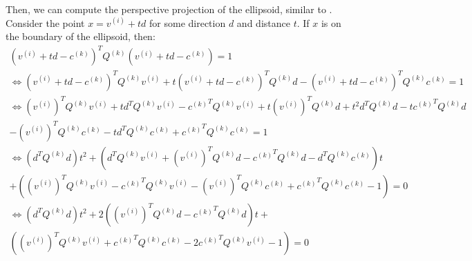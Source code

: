 \documentclass{article}
\theoremstyle{case}
\newcommand{\ck}{{c^{(k)}}}
\newcommand{\qk}{{Q^{(k)}}}
\begin{document}
Then, we can compute the perspective projection of the ellipsoid, similar to \cite{eberly_2013}.
Consider the point $x = v^{(i)} + td$ for some direction $d$ and distance $t$.
If $x$ is on the boundary of the ellipsoid, then:
\begin{align*}
(v^{(i)} + t d - \ck )^T \qk  (v^{(i)} + t d - \ck ) = 1 \\
\Longleftrightarrow (v^{(i)} + t d - \ck )^T \qk  v^{(i)} + t (v^{(i)} + t d - \ck )^T \qk  d - (v^{(i)} + t d - \ck )^T \qk  \ck  = 1 \\
\Longleftrightarrow \left(v^{(i)}\right)^T \qk  v^{(i)} + t d^T \qk  v^{(i)} - \ck ^T \qk  v^{(i)} + t \left(v^{(i)}\right)^T \qk  d + t^2 d^T \qk  d - t \ck ^T \qk  d \\- \left(v^{(i)}\right)^T \qk  \ck  - t d^T \qk  \ck + \ck ^T \qk  \ck  = 1 \\
\Longleftrightarrow \left(d^T\qk d
\right) t^2 + \left(
d^T \qk  v^{(i)} +  \left(v^{(i)}\right)^T \qk  d - \ck ^T \qk  d - d^T \qk  \ck 
\right) t \\ +  \left(
\left(v^{(i)}\right)^T \qk  v^{(i)} - \ck ^T \qk  v^{(i)} - \left(v^{(i)}\right)^T \qk  \ck   + \ck ^T \qk  \ck  - 1
\right) = 0 \\
\Longleftrightarrow \left(d^T\qk d
\right) t^2 + 2\left(
\left(v^{(i)}\right)^T \qk  d - \ck ^T\qk d
\right) t + \\ \left(
\left(v^{(i)}\right)^T \qk  v^{(i)} + \ck ^T \qk  \ck  - 2 \ck ^T \qk  v^{(i)} - 1
\right) = 0
\end{align*}
\end{document}
